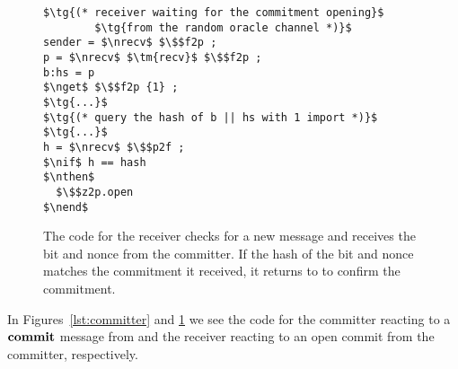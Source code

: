 \begin{figure}
\begin{lstlisting}[basicstyle=\footnotesize\BeraMonottFamily, frame=single, mathescape]
$\tg{(* receiver waiting for the commitment opening}$
        $\tg{from the random oracle channel *)}$
sender = $\nrecv$ $\$$f2p ;
p = $\nrecv$ $\tm{recv}$ $\$$f2p ;
b:hs = p
$\nget$ $\$$f2p {1} ; 
$\tg{...}$
$\tg{(* query the hash of b || hs with 1 import *)}$
$\tg{...}$
h = $\nrecv$ $\$$p2f ;
$\nif$ h == hash
$\nthen$
  $\$$z2p.open
$\nend$
\end{lstlisting}
\caption{The code for the receiver checks for a new message and receives the bit and nonce from the committer. If the hash of the bit and nonce matches the commitment it received, it returns  to \Z to confirm the commitment.}
\label{lst:receiver}
\vspace{-3mm}
\end{figure}

In Figures~\ref{lst:committer} and \ref{lst:receiver} we see the code for the committer reacting to a $\mathbf{commit}$ message from \Z and the receiver reacting to an open commit from the committer, respectively. 

%
%

